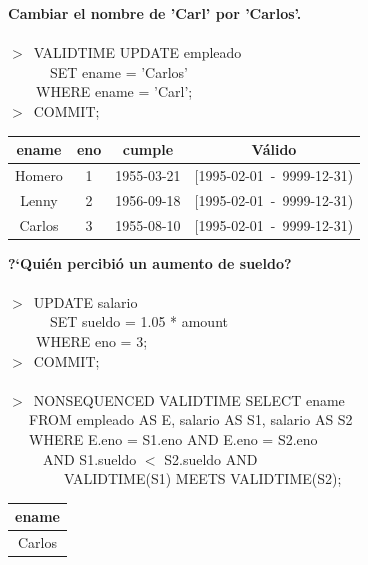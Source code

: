 \documentclass[a4paper,12pt,oneside]{report}
\begin{document}
\textbf{Cambiar el nombre de 'Carl' por 'Carlos'.}\\
\ \\
$>$\ VALIDTIME UPDATE empleado\\
\ \ \ \ \ \ SET ename = 'Carlos'\\
\ \ \ \ WHERE ename = 'Carl';\\
$>$\ COMMIT;
\begin{center}
\begin{tabular}{|c|c|c||c|}
\hline
ename & eno & cumple & V\'alido\\
\hline
Homero & 1 & 1955-03-21 & [1995-02-01\ -\ 9999-12-31)\\
\hline
Lenny & 2 & 1956-09-18 & [1995-02-01\ -\ 9999-12-31)\\
\hline
Carlos & 3 & 1955-08-10 & [1995-02-01\ -\ 9999-12-31)\\
\hline
\end{tabular}
\end{center}
\textbf{?`Qui\'en percibi\'o un aumento de sueldo?}\\
\ \\
$>$\ UPDATE salario\\
\ \ \ \ \ \ SET sueldo = 1.05 * amount\\
\ \ \ \ WHERE eno = 3;\\
$>$\ COMMIT;\\
\ \\
$>$\ NONSEQUENCED VALIDTIME SELECT ename\\
\ \ \ FROM empleado AS E, salario AS S1, salario AS S2\\
\ \ \ WHERE E.eno = S1.eno AND E.eno = S2.eno\\
\ \ \ \ \ AND S1.sueldo $<$ S2.sueldo AND \\
\ \ \ \ \ \ \ \ VALIDTIME(S1) MEETS VALIDTIME(S2);
\begin{center}
\begin{tabular}{|c|}
\hline
ename\\
\hline
Carlos\\
\hline
\end{tabular}
\end{center}
\end{document}
